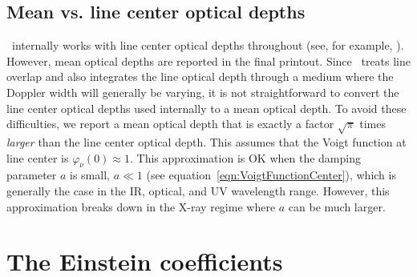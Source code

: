 \subsection{Mean vs. line center optical depths}

\Cloudy\ internally works with line center optical depths throughout (see, for
example, \citealp{Mihalas1978}). However, mean optical depths are reported in
the final printout. Since \Cloudy\ treats line overlap and also integrates the
line optical depth through a medium where the Doppler width will generally be
varying, it is not straightforward to convert the line center optical depths
used internally to a mean optical depth. To avoid these difficulties, we
report a mean optical depth that is exactly a factor $\sqrt\pi$ times
\emph{larger} than the line center optical depth. This assumes that the Voigt
function at line center is ${\varphi _\nu }(0) \approx 1$. This approximation
is OK when the damping parameter $a$ is small, $a\ll1$ (see
equation~\ref{eqn:VoigtFunctionCenter}), which is generally the case in the
IR, optical, and UV wavelength range. However, this approximation breaks down
in the X-ray regime where $a$ can be much larger.

\section{The Einstein coefficients}

